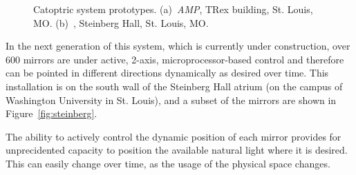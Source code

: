 \begin{figure}[ht]
\centering
{}
\qquad \qquad
{}
\caption{Catoptric system prototypes.
(a)~\emph{AMP}, TRex building, St. Louis, MO.
(b)~, Steinberg Hall, St. Louis, MO.
}
\label{fig:proto}
\end{figure}

In the next generation of this system, which is currently under construction,
over 600 mirrors are under active, 2-axis, microprocessor-based control and
therefore can be pointed in different directions dynamically as desired
over time. This installation is on the south wall of the Steinberg Hall
atrium (on
the campus of Washington University in St. Louis), and a subset of the
mirrors are shown in Figure~\ref{fig:steinberg}.

The ability to actively control the dynamic position of each mirror provides
for unprecidented capacity to position the available natural light where
it is desired.  This can easily change over time, as the usage of the
physical space changes.


